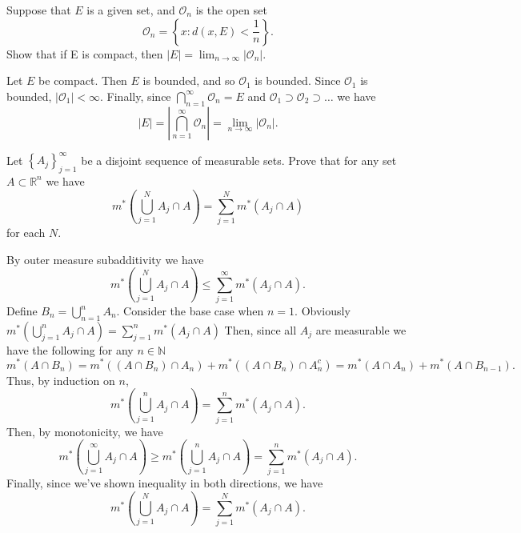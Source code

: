\begin{solution}
\end{solution}

\pagebreak

\begin{problem}{5}
  Suppose that $E$ is a given set, and $\mathcal{O}_{n}$ is the open set
  \[
  \mathcal{O}_{n} = \left\{ x : d(x,E) < \frac{1}{n} \right\}
  .\] 
  Show that if E is compact, then $|E| = \lim_{n \to \infty} \left| \mathcal{O}_{n} \right|$.
\end{problem}

\begin{solution}
  Let $E$ be compact. 
  Then $E$ is bounded, and so $\mathcal{O}_{1}$ is bounded.
  Since $\mathcal{O}_{1}$ is bounded, $\left| \mathcal{O}_{1} \right| < \infty$.
  Finally, since $\bigcap_{n=1}^{\infty}\mathcal{O}_{n} = E$ and $\mathcal{O}_{1} \supset \mathcal{O}_{2} \supset \ldots $ we have
  \[
  \left| E \right| = \left| \bigcap_{n=1}^{\infty} \mathcal{O}_{n} \right| = \lim_{n \to \infty} \left| \mathcal{O}_{n} \right|
  .\] 

\end{solution}

\pagebreak

\begin{problem}{6}
  Let $\left\{ A_{j} \right\}_{j=1}^{\infty}$ be a disjoint sequence of measurable sets.
  Prove that for any set $A \subset \mathbb{R}^{n}$ we have 
  \[
  m^{*}\left( \bigcup_{j=1}^{N} A_{j} \cap A  \right) = \sum_{j=1}^{N} m^{*}\left( A_{j} \cap A \right)
  \] 
  for each $N$.
\end{problem}

\begin{solution}
  By outer measure subadditivity we have 
  \[
  m^{*}\left( \bigcup_{j=1}^{N}  A_{j} \cap A \right) \leq \sum_{j=1}^{\infty} m^{*}\left( A_{j} \cap A \right)
  .\] 
  Define $B_{n} = \bigcup_{n=1}^{n}A_{n} $.
  Consider the base case when $n = 1$.
  Obviously $m^{*}\left( \bigcup_{j=1}^{n} A_{j} \cap A  \right) = \sum_{j=1}^{n} m^{*}\left( A_{j} \cap A \right)$
  Then, since all $A_{j}$ are measurable we have the following for any $n \in \mathbb{N}$
  \[
  m^{*}(A \cap B_{n}) = m^{*}\left( \left( A \cap B_{n} \right) \cap A_{n} \right) + m^{*}\left( \left( A \cap B_{n} \right) \cap A_{n}^{c} \right) = m^{*}\left( A \cap A_{n} \right) + m^{*}\left( A \cap B_{n-1} \right)
  .\] 
  Thus, by induction on $n$, 
  \[
    m^{*}\left( \bigcup_{j=1}^{n}  A_{j} \cap A \right) = \sum_{j=1}^{n} m^{*}\left( A_{j} \cap A \right)
  .\] 
  Then, by monotonicity, we have 
  \[
  m^{*}\left( \bigcup_{j=1}^{\infty} A_{j} \cap A  \right) \geq m^{*}\left( \bigcup_{j=1}^{n} A_{j} \cap A  \right) = \sum_{j=1}^{n} m^{*}\left( A_{j} \cap A \right)
  .\] 
  Finally, since we've shown inequality in both directions, we have
  \[
    m^{*}\left( \bigcup_{j=1}^{N} A_{j} \cap A  \right) = \sum_{j=1}^{N} m^{*}\left( A_{j} \cap A \right)
  .\] 

  
\end{solution}
